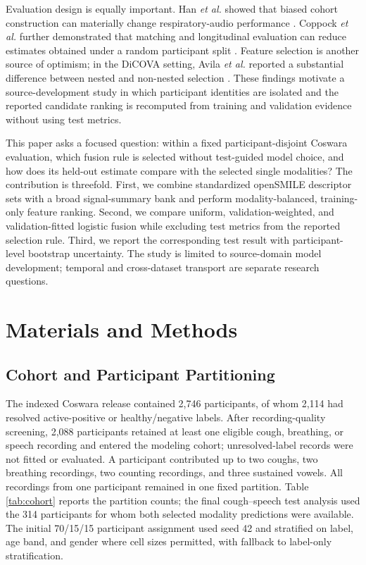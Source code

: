 \documentclass[conference]{IEEEtran}
\begin{document}
Evaluation design is equally important. Han \emph{et al.} showed that biased
cohort construction can materially change respiratory-audio performance
\cite{han2022realistic}. Coppock \emph{et al.} further demonstrated that
matching and longitudinal evaluation can reduce estimates obtained under a
random participant split \cite{coppock2024audio}. Feature selection is another
source of optimism; in the DiCOVA setting, Avila \emph{et al.} reported a
substantial difference between nested and non-nested selection
\cite{avila2021feature}. These findings motivate a source-development study in
which participant identities are isolated and the reported candidate ranking
is recomputed from training and validation evidence without using test metrics.

This paper asks a focused question: within a fixed participant-disjoint Coswara
evaluation, which fusion rule is selected without test-guided model choice,
and how does its held-out estimate compare with the selected single modalities?
The contribution is threefold. First, we combine
standardized openSMILE descriptor sets with a broad signal-summary bank and
perform modality-balanced, training-only feature ranking. Second, we compare
uniform, validation-weighted, and validation-fitted logistic fusion while
excluding test metrics from the reported selection rule. Third, we report the
corresponding test result with
participant-level bootstrap uncertainty. The study is
limited to source-domain model development; temporal and cross-dataset
transport are separate research questions.

\section{Materials and Methods}

\subsection{Cohort and Participant Partitioning}

The indexed Coswara release contained 2,746 participants, of whom 2,114 had
resolved active-positive or healthy/negative labels. After recording-quality
screening, 2,088 participants retained at least one eligible cough, breathing,
or speech recording and entered the modeling cohort; unresolved-label records
were not fitted or evaluated. A participant contributed up to two coughs, two
breathing recordings, two counting recordings, and three sustained vowels.
All recordings from one participant remained in one fixed partition. Table
\ref{tab:cohort} reports the partition counts; the final cough--speech test
analysis used the 314 participants for whom both selected modality predictions
were available. The initial 70/15/15 participant assignment used seed 42 and
stratified on label, age band, and gender where cell sizes permitted, with
fallback to label-only stratification.
\end{document}
